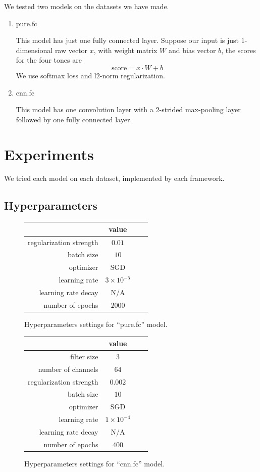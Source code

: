 \documentclass[a4paper]{article}
\begin{document}
We tested two models on the datasets we have made.
\begin{enumerate}
\item pure.fc

	This model has just one fully connected layer. Suppose our input is just $1$-dimensional raw vector $x$, with weight matrix $W$ and bias vector $b$, the scores for the four tones are
	\[
		\text{score} = x \cdot W + b
	\]
	We use softmax loss and l$2$-norm regularization.

\item cnn.fc

	This model has one convolution layer with a 2-strided max-pooling layer followed by one fully connected layer.

\end{enumerate}

\section{Experiments}

We tried each model on each dataset, implemented by each framework.

\subsection{Hyperparameters}

\begin{figure}[H]
\centering
\begin{tabular}{|r|c|c|c|}
\hline
 & value \\
\hline
regularization strength & $0.01$ \\
\hline
batch size & $10$ \\
\hline
optimizer & SGD \\
\hline
learning rate & $3\times10^{-5}$\\
\hline
learning rate decay & N/A \\
\hline
number of epochs & $2000$ \\
\hline
\end{tabular}
\caption{Hyperparameters settings for ``pure.fc'' model.}
\end{figure}

\begin{figure}[H]
\centering
\begin{tabular}{|r|c|c|c|}
\hline
 & value \\
\hline
filter size & $3$ \\
\hline
number of channels & $64$ \\
\hline
regularization strength & $0.002$ \\
\hline
batch size & $10$ \\
\hline
optimizer & SGD \\
\hline
learning rate & $1\times10^{-4}$\\
\hline
learning rate decay & N/A \\
\hline
number of epochs & $400$ \\
\hline
\end{tabular}
\caption{Hyperparameters settings for ``cnn.fc'' model.}
\end{figure}
\end{document}
